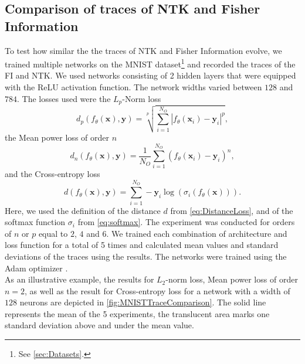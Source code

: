 \subsection{Comparison of traces of NTK and Fisher Information}\label{sec:TraceComparisonExperiment}
To test how similar the the traces of NTK and Fisher Information evolve, we trained multiple networks on the MNIST dataset\footnote{See \cref{sec:Datasets}.} and recorded the traces of the FI and NTK. We used networks consisting of 2 hidden layers that were equipped with the ReLU activation function. The network widths varied between $128$ and $784$. The losses used were the $L_p$-Norm loss \cite{LpNormSource}
\begin{equation}
	d_p(f_\theta(\mathbf{x}),\mathbf{y}) = \sqrt[p]{\sum_{i=1}^{N_O} |f_\theta(\mathbf{x}_i) - \mathbf{y}_i|^p},
\end{equation}
the Mean power loss of order $n$
\begin{equation}
	d_n(f_\theta(\mathbf{x}),\mathbf{y}) = \frac{1}{N_O} \sum_{i=1}^{N_O} (f_\theta(\mathbf{x}_i)-\mathbf{y}_i)^n,
\end{equation}
and the Cross-entropy loss \cite{LossExamplePaper}
\begin{equation}
	d(f_\theta(\mathbf{x}),\mathbf{y}) = \sum_{i=1}^{N_O} -\mathbf{y}_i \log(\sigma_i(f_\theta(\mathbf{x}))).
\end{equation}
Here, we used the definition of the distance $d$ from \cref{eq:DistanceLoss}, and of the softmax function $\sigma_i$ from \cref{eq:softmax}. The experiment was conducted for orders of $n$ or $p$ equal to $2$, $4$ and $6$. We trained each combination of architecture and loss function for a total of 5 times and calculated mean values and standard deviations of the traces using the results. The networks were trained using the Adam optimizer \cite{adamPaper}.\\
As an illustrative example, the results for $L_2$-norm loss, Mean power loss of order $n=2$, as well as the result for Cross-entropy loss for a network with a width of $128$ neurons are depicted in \cref{fig:MNISTTraceComparison}. The solid line represents the mean of the 5 experiments, the translucent area marks one standard deviation above and under the mean value.\\
